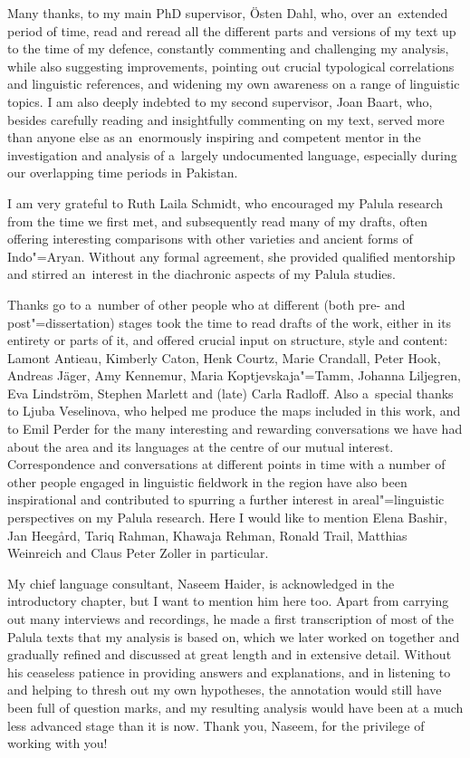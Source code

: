 \begin{refsection}
Many thanks, to my main PhD supervisor, Östen Dahl, who, over
an~extended period of time, read and reread all the different parts and versions of my text up to the time of my defence, constantly commenting and challenging my analysis, while also suggesting improvements, pointing out crucial typological correlations and linguistic references, and widening my own awareness on a range of linguistic topics. I am also deeply indebted to my second supervisor, Joan Baart, who,
besides carefully reading and insightfully commenting on my text, served more than anyone else as an~enormously inspiring and competent mentor in the investigation and analysis of a~largely undocumented language, especially during our overlapping time periods in Pakistan.


I am very grateful to Ruth Laila Schmidt, who encouraged my Palula research from the time we first met, and subsequently read many of my drafts, often offering interesting comparisons with other \iliShina varieties and ancient forms of Indo"=Aryan. Without any formal agreement, she
provided qualified mentorship and stirred an~interest in the diachronic aspects of my Palula studies.


Thanks go to a~number of other people who at different (both pre- and post"=dissertation) stages took the time to read drafts of the work, either in its entirety or parts of it, and offered crucial input on structure, style and content: Lamont Antieau, Kimberly Caton, Henk Courtz, Marie Crandall, Peter Hook, Andreas Jäger, Amy Kennemur, Maria Koptjevskaja"=Tamm, Johanna Liljegren, Eva Lindström, Stephen Marlett and (late) Carla Radloff. Also a~special thanks to Ljuba Veselinova, who helped me produce the maps included in this work, and to Emil Perder for the many interesting and rewarding conversations we have had about
the area and its languages at the centre of our mutual interest. Correspondence and conversations at different points in time with a number of other people engaged in linguistic fieldwork in the region have also been inspirational and contributed to spurring a further interest in areal"=linguistic perspectives on my Palula research. Here I would like to mention Elena Bashir, Jan Heegård, Tariq Rahman, Khawaja Rehman, Ronald Trail, Matthias Weinreich and Claus Peter Zoller in particular.


My chief language consultant, Naseem Haider, is acknowledged in the introductory chapter, but I want to mention him here too. Apart from carrying out many interviews and recordings, he made a first transcription of most of the Palula texts that my analysis is based on, which we later worked on together and gradually refined and discussed at great length and in extensive detail. Without his ceaseless patience in providing answers and explanations, and in listening to and helping to thresh out my own hypotheses, the annotation would still have been full of question marks, and my resulting analysis would have been at a much less advanced stage than it is now. Thank you, Naseem, for the privilege of working with you!



\end{refsection}
